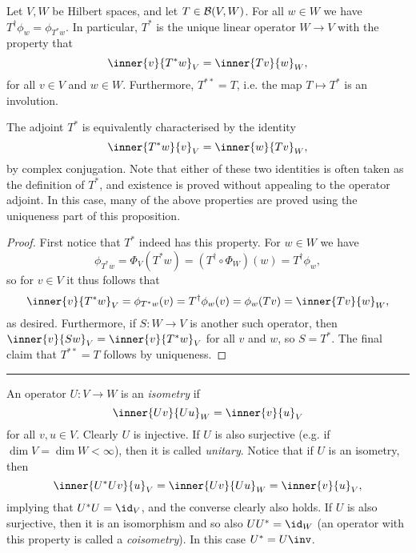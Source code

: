 \documentclass[article, a4paper, 11pt, oneside]{memoir}
\numberwithin{equation}{chapter}
\newcommand\fleuronbreak{\fancybreak{\textcolor{linkcolor}{\adfhangingflatleafleft}}}
\begin{document}
\begin{proposition}
    Let $V,W$ be Hilbert spaces, and let $T \in \mathcal{B}(V,W)$. For all $w \in W$ we have $T^\dagger \phi_w = \phi_{T^* w}$. In particular, $T^*$ is the unique linear operator $W \to V$ with the property that
    \begin{equation*}
        \inner{v}{T^*w}_V = \inner{Tv}{w}_W,
    \end{equation*}
    for all $v \in V$ and $w \in W$. Furthermore, $T^{**} = T$, i.e. the map $T \mapsto T^*$ is an involution.
\end{proposition}
%
The adjoint $T^*$ is equivalently characterised by the identity
%
\begin{equation*}
    \inner{T^*w}{v}_V = \inner{w}{Tv}_W,
\end{equation*}
%
by complex conjugation. Note that either of these two identities is often taken as the definition of $T^*$, and existence is proved without appealing to the operator adjoint. In this case, many of the above properties are proved using the uniqueness part of this proposition.

\begin{proof}
    First notice that $T^*$ indeed has this property. For $w \in W$ we have
    \begin{equation*}
        \phi_{T^* w}
            = \Phi_V (T^* w)
            = (T^\dagger \circ \Phi_W)(w)
            = T^\dagger \phi_w,
    \end{equation*}
    so for $v \in V$ it thus follows that
    \begin{equation*}
        \inner{v}{T^* w}_V
            = \phi_{T^* w}(v)
            = T^\dagger \phi_w (v)
            = \phi_w(Tv)
            = \inner{Tv}{w}_W,
    \end{equation*}
    as desired. Furthermore, if $S \colon W \to V$ is another such operator, then $\inner{v}{Sw}_V = \inner{v}{T^*w}_V$ for all $v$ and $w$, so $S = T^*$. The final claim that $T^{**} = T$ follows by uniqueness.
\end{proof}

\fleuronbreak

An operator $U \colon V \to W$ is an \emph{isometry} if
%
\begin{equation*}
    \inner{Uv}{Uu}_W
        = \inner{v}{u}_V
\end{equation*}
%
for all $v,u \in V$. Clearly $U$ is injective. If $U$ is also surjective (e.g. if $\dim V = \dim W < \infty$), then it is called \emph{unitary}. Notice that if $U$ is an isometry, then
%
\begin{equation*}
    \inner{U^*Uv}{u}_V
        = \inner{Uv}{Uu}_W
        = \inner{v}{u}_V,
\end{equation*}
%
implying that $U^*U = \id_V$, and the converse clearly also holds. If $U$ is also surjective, then it is an isomorphism and so also $UU^* = \id_W$ (an operator with this property is called a \emph{coisometry}). In this case $U^* = U\inv$.
\end{document}
